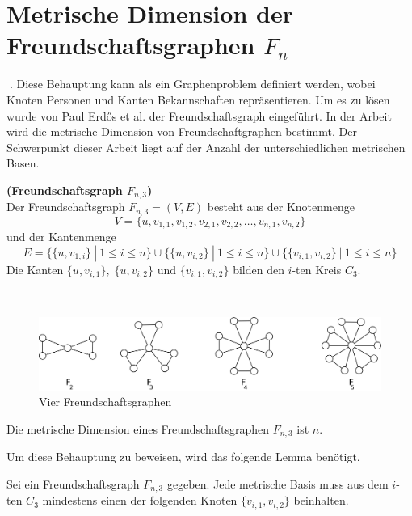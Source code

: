 \section{Metrische Dimension der Freundschaftsgraphen $F_{n}$}
\vspace{-3mm}
\grqq$\;$. Diese Behauptung kann als ein Graphenproblem definiert werden, wobei Knoten Personen und Kanten Bekannschaften repräsentieren. Um es zu lösen wurde von Paul Erdős et al. \cite{Erdos} der Freundschaftsgraph eingeführt. In der Arbeit \grqq$\;$\cite{amal} wird die metrische Dimension von Freundschaftgraphen bestimmt. Der Schwerpunkt dieser Arbeit liegt auf der Anzahl der unterschiedlichen metrischen Basen.
\begin{defi}{\textbf{(Freundschaftsgraph $F_{n,3}$)}}\\
Der Freundschaftsgraph $F_{n,3}=(V,E)$ besteht aus der Knotenmenge $$V = \{u,v_{1,1},v_{1,2},v_{2,1},v_{2,2},\ldots,v_{n,1},v_{n,2}\}$$ und der Kantenmenge $$E = \{ \{u,v_{1,i}\}~|~ 1 \leq i \leq n \} \cup \{ \{u,v_{i,2}\}~|~ 1 \leq i \leq n \} \cup \{ \{ v_{i,1}, v_{i,2} \} ~|~ 1 \leq i \leq n \}$$
Die Kanten $\{u,v_{i,1}\},\;\{u,v_{i,2}\}$ und $\{v_{i,1},v_{i,2}\}$ bilden den $i$-ten Kreis $C_3$.
\end{defi}
\begin{bsp}~
\vspace{-4mm}
\begin{figure}[h!]
\centering
 		 \includegraphics[width=360pt]{bilder/freunschaftsgraph.pdf}
   \caption{Vier Freundschaftsgraphen}
   \label{bild:fg}
\end{figure}
\vspace{-3mm}
\end{bsp}
\begin{lem}
\label{Freundschaftsgraphen}
Die metrische Dimension eines Freundschaftsgraphen $F_{n,3}$ ist $n$.
\end{lem}
\vspace{-2mm}
Um diese Behauptung zu beweisen, wird das folgende Lemma benötigt. 
\begin{lem}
\label{mindfreundschaftsgraph}
Sei ein Freundschaftsgraph $F_{n,3}$ gegeben. Jede metrische Basis muss aus dem $i$-ten $C_3$ mindestens einen der folgenden Knoten $\{v_{i,1},v_{i,2}\}$ beinhalten. 
\end{lem}

